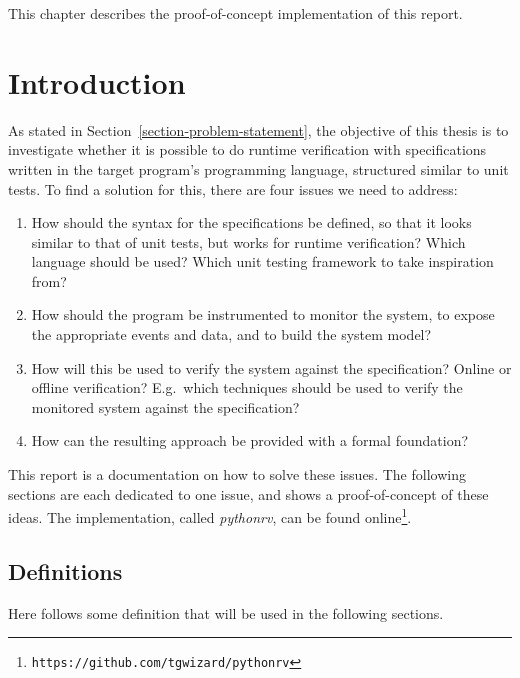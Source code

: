 \documentclass[a4paper,11pt]{kth-mag}
\begin{document}
This chapter describes the proof-of-concept implementation of this report.


\section{Introduction}

As stated in Section~\ref{section-problem-statement}, the objective of this
thesis is to investigate whether it is possible to do runtime verification with
specifications written in the target program's programming language, structured
similar to unit tests. To find a solution for this, there are four issues we
need to address:

\begin{enumerate}
	\item How should the syntax for the specifications be defined, so that it
		looks similar to that of unit tests, but works for runtime verification?
		Which language should be used? Which unit testing framework to take
		inspiration from?
	\item How should the program be instrumented to monitor the system, to expose
		the appropriate events and data, and to build the system model?
	\item How will this be used to verify the system against the
		specification? Online or offline verification? E.g.\ which techniques
		should be used to verify the monitored system against the specification?
	\item How can the resulting approach be provided with a formal foundation?
\end{enumerate}

This report is a documentation on how to solve these issues. The following
sections are each dedicated to one issue, and shows a proof-of-concept of these
ideas. The implementation, called \textit{pythonrv}, can be found
online\footnote{\texttt{https://github.com/tgwizard/pythonrv}}.


\subsection{Definitions}

Here follows some definition that will be used in the following sections.
\end{document}
